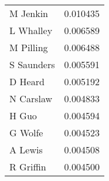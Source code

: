 \begin{table}[H] \centering\begin{tabular}{lr}
\toprule
   \hphantom{ } M Jenkin &  0.010435 \\
  \hphantom{ } L Whalley &  0.006589 \\
  \hphantom{ } M Pilling &  0.006488 \\
 \hphantom{ } S Saunders &  0.005591 \\
    \hphantom{ } D Heard &  0.005192 \\
  \hphantom{ } N Carslaw &  0.004833 \\
      \hphantom{ } H Guo &  0.004594 \\
    \hphantom{ } G Wolfe &  0.004523 \\
    \hphantom{ } A Lewis &  0.004508 \\
  \hphantom{ } R Griffin &  0.004500 \\
\bottomrule
\end{tabular}

    \label{tab:pagerank_Author}

    \end{table}

    